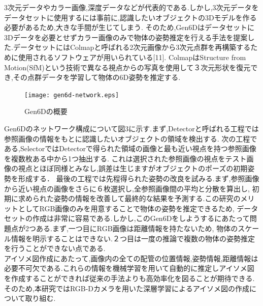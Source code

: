 3次元データやカラー画像,深度データなどが代表的である.しかし,3次元データをデータセットに使用するには事前に,認識したいオブジェクトの3Dモデルを作る必要があるため,大きな手間が生じてしまう.
そのため,Gen6Dはデータセットに3Dデータを必要とせずカラー画像のみで物体の姿勢推定を行える手法を提案した.データセットにはColmapと呼ばれる2次元画像から3次元点群を再構築するために使用されるソフトウェアが用いられている[11].
ColmapはStructure from Motion(SfM)という技術で異なる視点からの写真を使用して３次元形状を復元でき,その点群データを学習して物体の6D姿勢を推定する.\\
\begin{figure}[htbt]
	\centering
	 \texttt{[image: gen6d-network.eps]}
	 \caption{Gen6Dの概要}
	 \label{fig:f2}
\end{figure}

Gen6Dのネットワーク構成について図3に示す.まず,Detectorと呼ばれる工程では参照画像の情報をもとに認識したいオブジェクトの領域を検出する.
次の工程である,SelectorではDetectorで得られた領域の画像と最も近い視点を持つ参照画像を複数枚ある中から1つ抽出する.
これは選択された参照画像の視点をテスト画像の視点とほぼ同様とみなし,誤差は生じますがオブジェクトのポーズの初期姿勢を形成する．
最後の工程では先程得られた姿勢の改良を試みる.まず,参照画像から近い視点の画像をさらに６枚選択し,全参照画像間の平均と分散を算出し,
初期に求められた姿勢の情報を改善して最終的な結果を予測する.この研究のメリットとしてRGB画像のみを用意することで物体の姿勢を推定できるため,
データセットの作成は非常に容易である.しかし,このGen6Dをしようするにあたって問題点が2つある.まず,一つ目にRGB画像は距離情報を持たないため,
物体のスケール情報を明示することはできない.２つ目は一度の推論で複数の物体の姿勢推定を行うことができない点である.\\

アイソメ図作成にあたって,画像内の全ての配管の位置情報,姿勢情報,距離情報は必要不可欠である.これらの情報を機械学習を用いて自動的に推定しアイソメ図を作成することができれば従来の手法よりも高効率化を図ることが期待できる.
そのため,本研究ではRGB-Dカメラを用いた深層学習によるアイソメ図の作成について取り組む.

